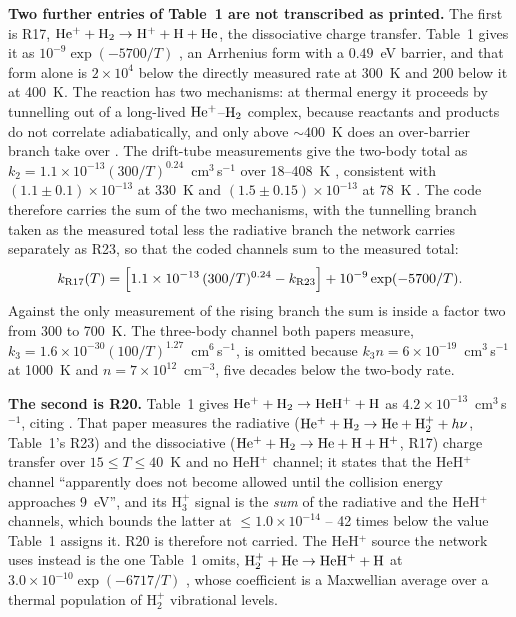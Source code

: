 \textbf{Two further entries of Table~1 are not transcribed as printed.} The first is
R17, ${\rm He^+}+{\rm H_2}\to{\rm H^+}+{\rm H}+{\rm He}$, the dissociative
charge transfer. Table~1 gives it as $10^{-9}\exp(-5700/T)$
\citep{Moses2000}, an Arrhenius form with a $0.49$~eV barrier, and that form
alone is $2\times10^{4}$ below the directly measured rate at 300~K and 200
below it at 400~K. The reaction has two mechanisms: at thermal energy it
proceeds by tunnelling out of a long-lived ${\rm He^+}$--${\rm H_2}$ complex,
because reactants and products do not correlate adiabatically, and only above
$\sim400$~K does an over-barrier branch take over
\citep{Boehringer1986}. The drift-tube measurements give the two-body total
as $k_2=1.1\times10^{-13}(300/T)^{0.24}$~cm$^3$\,s$^{-1}$ over 18--408~K
\citep{Boehringer1986}, consistent with $(1.1\pm0.1)\times10^{-13}$ at 330~K
and $(1.5\pm0.15)\times10^{-13}$ at 78~K \citep{Johnsen1980}. The code
therefore carries the sum of the two mechanisms, with the tunnelling branch
taken as the measured total less the radiative branch the network carries
separately as R23, so that the coded channels sum to the measured total:
\[
   k_{\rm R17}(T)=\Bigl[1.1\times10^{-13}\,(300/T)^{0.24}-k_{\rm R23}\Bigr]
                  +10^{-9}\exp(-5700/T).
\]
Against the only measurement of the rising branch \citep[][their Fig.~3,
carried to an effective temperature of 700~K]{Johnsen1980} the sum is inside
a factor two from 300 to 700~K. The three-body channel both papers measure,
$k_3=1.6\times10^{-30}(100/T)^{1.27}$~cm$^6$\,s$^{-1}$, is omitted because
$k_3n=6\times10^{-19}$~cm$^3$\,s$^{-1}$ at 1000~K and $n=7\times10^{12}$~cm$^{-3}$,
five decades below the two-body rate.

\textbf{The second is R20.}
Table~1 gives ${\rm He^+}+{\rm H_2}\to{\rm HeH^+}+{\rm H}$ as
$4.2\times10^{-13}$~cm$^3$\,s$^{-1}$, citing \citet{Schauer1989}. That paper
measures the radiative
(${\rm He^+}+{\rm H_2}\to{\rm He}+{\rm H_2^+}+h\nu$, Table~1's R23) and the
dissociative (${\rm He^+}+{\rm H_2}\to{\rm He}+{\rm H}+{\rm H^+}$, R17)
charge transfer over $15\le T\le40$~K and no HeH$^+$ channel; it states that
the HeH$^+$ channel ``apparently does not become allowed until the collision
energy approaches 9~eV'', and its H$_3^+$ signal is the \emph{sum} of the
radiative and the HeH$^+$ channels, which bounds the latter at
$\le1.0\times10^{-14}$ -- 42 times below the value Table~1 assigns it. R20 is
therefore not carried. The HeH$^+$ source the network uses instead is the one
Table~1 omits, ${\rm H_2^+}+{\rm He}\to{\rm HeH^+}+{\rm H}$ at
$3.0\times10^{-10}\exp(-6717/T)$ \citep{Black1978}, whose coefficient is a
Maxwellian average over a thermal population of H$_2^+$ vibrational levels.

